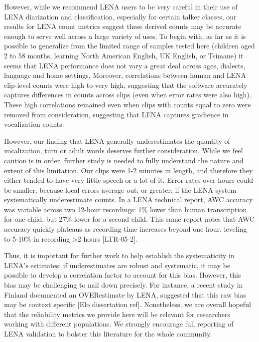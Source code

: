 \documentclass[english,floatsintext,man]{apa6}
\begin{document}
However, while we recommend LENA users to be very careful in their use
of LENA diarization and classification, especially for certain talker
classes, our results for LENA count metrics suggest these derived counts
may be accurate enough to serve well across a large variety of uses. To
begin with, as far as it is possible to generalize from the limited
range of samples tested here (children aged 2 to 58 months, learning
North American English, UK English, or Tsimane) it seems that LENA
performance does not vary a great deal across ages, dialects, language
and home settings. Moreover, correlations between human and LENA
clip-level counts were high to very high, suggesting that the software
accurately captures differences in counts across clips (even when error
rates were also high). These high correlations remained even when clips
with counts equal to zero were removed from consideration, suggesting
that LENA captures gradience in vocalization counts.

However, our finding that LENA generally underestimates the quantity of
vocalization, turn or adult words deserves further consideration. While
we feel caution is in order, further study is needed to fully understand
the nature and extent of this limitation. Our clips were 1-2 minutes in
length, and therefore they either tended to have very little speech or a
lot of it. Error rates over hours could be smaller, because local errors
average out; or greater; if the LENA system systematically underestimate
counts. In a LENA technical report, AWC accuracy was variable across two
12-hour recordings: 1\% lower than human transcription for one child,
but 27\% lower for a second child. This same report notes that AWC
accuracy quickly plateaus as recording time increases beyond one hour,
leveling to 5-10\% in recording \textgreater{}2 hours {[}LTR-05-2{]}.

Thus, it is important for further work to help establish the
systematicity in LENA's estimates: if underestimates are robust and
systematic, it may be possible to develop a correlation factor to
account for this bias. However, this bias may be challenging to nail
down precisely. For instance, a recent study in Finland documented an
OVERestimate by LENA, suggested that this raw bias may be context
specific {[}Elo dissertation ref{]}. Nonetheless, we are overall hopeful
that the reliability metrics we provide here will be relevant for
researchers working with different populations. We strongly encourage
full reporting of LENA validation to bolster this literature for the
whole community.
\end{document}
